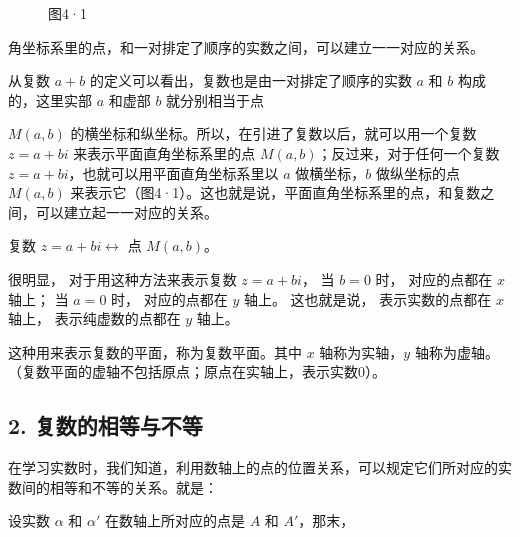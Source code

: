 \begin{figure}
\centering
{}
\caption{图4·1}
\end{figure}
角坐标系里的点，和一对排定了顺序的实数之间，可以建立一一对应的关系。

从复数 \(a + b\) 的定义可以看出，复数也是由一对排定了顺序的实数 \(a\) 和
\(b\) 构成的，这里实部 \(a\) 和虚部 \(b\) 就分别相当于点

\(M(a, b)\) 的横坐标和纵坐标。所以，在引进了复数以后，就可以用一个复数
\(z = a + bi\) 来表示平面直角坐标系里的点
\(M(a, b)\)；反过来，对于任何一个复数
\(z = a + bi\)，也就可以用平面直角坐标系里以 \(a\) 做横坐标，\(b\)
做纵坐标的点 \(M(a, b)\)
来表示它（图4·1）。这也就是说，平面直角坐标系里的点，和复数之间，可以建立起一一对应的关系。

复数 \(z = a + bi \leftrightarrow\) 点 \(M(a, b)\)。

很明显， 对于用这种方法来表示复数 \(z = a + bi\)， 当 \(b = 0\) 时，
对应的点都在 \(x\) 轴上； 当 \(a = 0\) 时， 对应的点都在 \(y\) 轴上。
这也就是说， 表示实数的点都在 \(x\) 轴上， 表示纯虚数的点都在 \(y\)
轴上。

这种用来表示复数的平面，称为复数平面。其中 \(x\) 轴称为实轴，\(y\)
轴称为虚轴。（复数平面的虚轴不包括原点；原点在实轴上，表示实数0）。

\subsection{2. 复数的相等与不等}

在学习实数时，我们知道，利用数轴上的点的位置关系，可以规定它们所对应的实数间的相等和不等的关系。就是：

设实数 \(\alpha\) 和 \(\alpha'\) 在数轴上所对应的点是 \(A\) 和
\(A'\)，那末，

